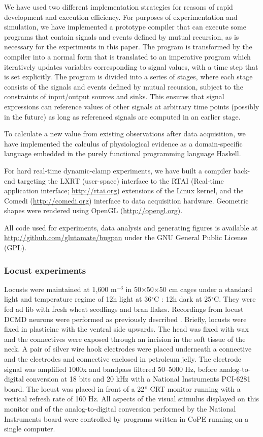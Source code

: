 We have used two different implementation strategies for reasons of
rapid development and execution efficiency. For purposes of
experimentation and simulation, we have implemented a prototype
compiler that can execute some programs that contain signals and
events defined by mutual recursion, as is necessary for the
experiments in this paper. The program is transformed by the compiler
into a normal form that is translated to an imperative program which
iteratively updates variables corresponding to signal values, with a
time step that is set explicitly. The program is divided into a series
of stages, where each stage consists of the signals and events defined
by mutual recursion, subject to the constraints of input/output
sources and sinks. This ensures that signal expressions can reference
values of other signals at arbitrary time points (possibly in the
future) as long as referenced signals are computed in an earlier
stage.

To calculate a new value from existing observations after data
acquisition, we have implemented the calculus of physiological
evidence as a domain-specific language embedded in the purely functional
programming language Haskell.

For hard real-time dynamic-clamp experiments, we have built a compiler
back-end targeting the LXRT (user-space) interface to the RTAI (Real-time
application interface; \url{http://rtai.org}) extensions of the Linux
kernel, and the Comedi (\url{http://comedi.org}) interface to data
acquisition hardware. Geometric shapes were rendered using OpenGL
(\url{http://opengl.org}).

All code used for experiments, data analysis and generating figures is
available at \url{http://github.com/glutamate/bugpan} under the GNU General
Public License (GPL).

\subsubsection*{Locust experiments}

Locusts were maintained at 1,600 m$^{-3}$ in 50$\times$50$\times$50 cm cages under a
standard light and temperature regime of 12h light at 36$^{\circ}$C : 12h dark
at 25$^{\circ}$C. They were fed ad lib with fresh wheat seedlings and bran
flakes. Recordings from locust DCMD neurons were performed as
previously described \citep{Matheson2004}. Briefly, locusts were fixed
in plasticine with the ventral side upwards. The head was fixed with
wax
and the connectives were exposed through an
incision in the soft tissue of the neck. A pair of silver wire hook
electrodes were placed underneath a connective and the electrodes
and connective enclosed in petroleum jelly. The electrode signal was
amplified 1000x and bandpass filtered 50--5000 Hz, before
analog-to-digital conversion at 18 bits and 20 kHz with a National
Instruments PCI-6281 board. The locust was placed in front of a 22''
CRT monitor running with a vertical refresh rate of 160 Hz. All
aspects of the visual stimulus displayed on this monitor and of
the analog-to-digital conversion performed by the National Instruments
board were controlled by programs written in
CoPE running on a single computer.

